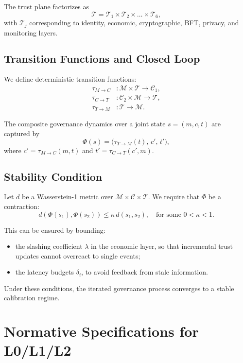 \documentclass[11pt]{article}
\begin{document}
The trust plane factorizes as
\[
\mathcal{T} = \mathcal{T}_1 \times \mathcal{T}_2 \times \ldots \times \mathcal{T}_6,
\]
with \(\mathcal{T}_j\) corresponding to identity, economic, cryptographic, BFT, privacy, and monitoring layers.

\subsection{Transition Functions and Closed Loop}

We define deterministic transition functions:
\begin{align}
\tau_{M \to C} &: \mathcal{M} \times \mathcal{T} \to \mathcal{C}_1, \\
\tau_{C \to T} &: \mathcal{C}_2 \times \mathcal{M} \to \mathcal{T}, \\
\tau_{T \to M} &: \mathcal{T} \to \mathcal{M}.
\end{align}

The composite governance dynamics over a joint state \(s = (m,c,t)\) are captured by
\[
\Phi(s) = \big( \tau_{T \to M}(t),\, c',\, t' \big),
\]
where \(c' = \tau_{M \to C}(m,t)\) and \(t' = \tau_{C \to T}(c',m)\).

\subsection{Stability Condition}

Let \(d\) be a Wasserstein-1 metric over \(\mathcal{M} \times \mathcal{C} \times \mathcal{T}\). We require that \(\Phi\) be a contraction:
\[
d(\Phi(s_1), \Phi(s_2)) \leq \kappa\, d(s_1, s_2), \quad \text{for some } 0 < \kappa < 1.
\]

This can be ensured by bounding:

\begin{itemize}
  \item the slashing coefficient \(\lambda\) in the economic layer, so that incremental trust updates cannot overreact to single events;
  \item the latency budgets \(\delta_i\), to avoid feedback from stale information.
\end{itemize}

Under these conditions, the iterated governance process converges to a stable calibration regime.

\section{Normative Specifications for L0/L1/L2}
\end{document}
